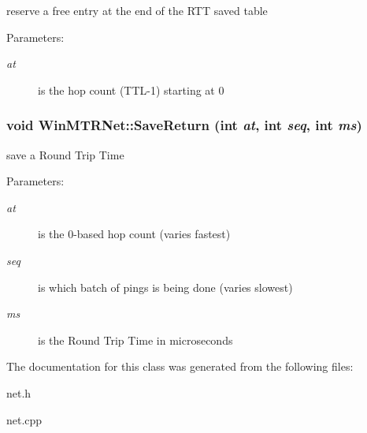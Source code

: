 reserve a free entry at the end of the RTT saved table \begin{Desc}
\item[Parameters:]
\begin{description}
\item[{\em at}]is the hop count (TTL-1) starting at 0 \end{description}
\end{Desc}
\hypertarget{classWinMTRNet_7d99bed3982761bdcaea919af7c84e18}{
\subsubsection[SaveReturn]{\setlength{\rightskip}{0pt plus 5cm}void WinMTRNet::SaveReturn (int {\em at}, \/  int {\em seq}, \/  int {\em ms})}}
\label{classWinMTRNet_7d99bed3982761bdcaea919af7c84e18}


save a Round Trip Time \begin{Desc}
\item[Parameters:]
\begin{description}
\item[{\em at}]is the 0-based hop count (varies fastest) \item[{\em seq}]is which batch of pings is being done (varies slowest) \item[{\em ms}]is the Round Trip Time in microseconds \end{description}
\end{Desc}


The documentation for this class was generated from the following files:\begin{CompactItemize}
\item 
net.h\item 
net.cpp\end{CompactItemize}

